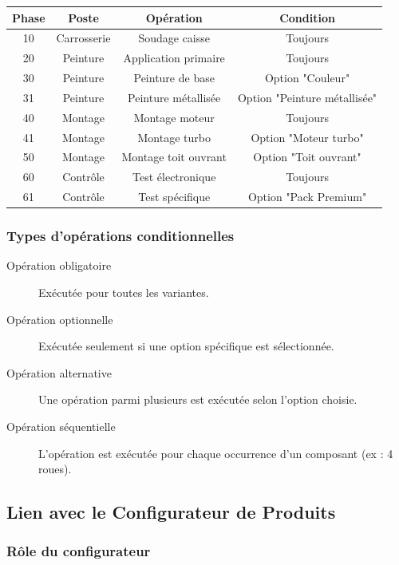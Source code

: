 \documentclass{article}
\begin{document}
\begin{table}[h]
\centering
\begin{tabular}{|c|c|c|c|}
\hline
\textbf{Phase} & \textbf{Poste} & \textbf{Opération} & \textbf{Condition} \\
\hline
10 & Carrosserie & Soudage caisse & Toujours \\
20 & Peinture & Application primaire & Toujours \\
30 & Peinture & Peinture de base & Option "Couleur" \\
31 & Peinture & Peinture métallisée & Option "Peinture métallisée" \\
40 & Montage & Montage moteur & Toujours \\
41 & Montage & Montage turbo & Option "Moteur turbo" \\
50 & Montage & Montage toit ouvrant & Option "Toit ouvrant" \\
60 & Contrôle & Test électronique & Toujours \\
61 & Contrôle & Test spécifique & Option "Pack Premium" \\
\hline
\end{tabular}
\end{table}

\subsubsection{Types d'opérations conditionnelles}

\begin{description}
    \item[Opération obligatoire] Exécutée pour toutes les variantes.
    \item[Opération optionnelle] Exécutée seulement si une option spécifique est sélectionnée.
    \item[Opération alternative] Une opération parmi plusieurs est exécutée selon l'option choisie.
    \item[Opération séquentielle] L'opération est exécutée pour chaque occurrence d'un composant (ex : 4 roues).
\end{description}

\subsection{Lien avec le Configurateur de Produits}

\subsubsection{Rôle du configurateur}
\end{document}
